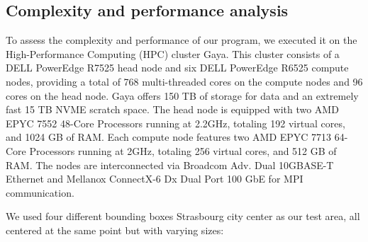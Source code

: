\documentclass[12pt]{article}
\begin{document}
\subsection{Complexity and performance analysis}

To assess the complexity and performance of our program, we executed it on
the High-Performance Computing (HPC) cluster Gaya. This cluster consists of a
DELL PowerEdge R7525 head node and six DELL PowerEdge R6525 compute nodes,
providing a total of 768 multi-threaded cores on the compute nodes and 96 cores
on the head node. Gaya offers 150 TB of storage for data and an extremely fast
15 TB NVME scratch space. The head node is equipped with two AMD EPYC 7552
48-Core Processors running at 2.2GHz, totaling 192 virtual cores, and 1024
GB of RAM. Each compute node features two AMD EPYC 7713 64-Core Processors
running at 2GHz, totaling 256 virtual cores, and 512 GB of RAM.
The nodes are interconnected via Broadcom Adv. Dual 10GBASE-T Ethernet and
Mellanox ConnectX-6 Dx Dual Port 100 GbE for MPI communication.

We used four different bounding boxes Strasbourg city center as our test area, all centered at the same point but with
varying sizes:
\end{document}
